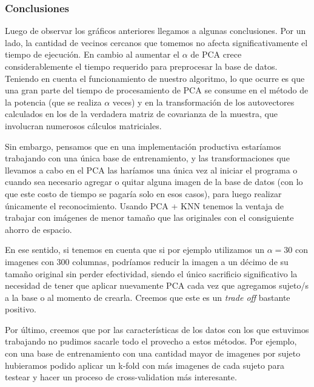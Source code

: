 \subsubsection*{Conclusiones}


Luego de observar los gráficos anteriores llegamos a algunas conclusiones.
Por un lado, la cantidad de vecinos cercanos que tomemos no afecta significativamente el tiempo de ejecución. En cambio al aumentar el $\alpha$ de PCA crece considerablemente el tiempo requerido para preprocesar la base de datos.
Teniendo en cuenta el funcionamiento de nuestro algoritmo, lo que ocurre es que una gran parte del tiempo de procesamiento de PCA se consume en el método de la potencia (que se realiza $\alpha$ veces) y en la transformación de los autovectores calculados en los de la verdadera matriz de covarianza de la muestra, que involucran numerosos cálculos matriciales.\newline

Sin embargo, pensamos que en una implementación productiva estaríamos trabajando con una única base de entrenamiento, y las transformaciones que llevamos a cabo en el PCA las haríamos una única vez al iniciar el programa o cuando sea necesario agregar o quitar alguna imagen de la base de datos (con lo que este costo de tiempo se pagaría solo en esos casos), para luego realizar únicamente el reconocimiento. Usando PCA + KNN tenemos la ventaja de trabajar con imágenes de menor tamaño que las originales con el consiguiente ahorro de espacio.

En ese sentido, si tenemos en cuenta que si por ejemplo utilizamos un $\alpha = 30$ con imagenes con 300 columnas, podríamos reducir la imagen a un décimo de su tamaño original sin perder efectividad, siendo el único sacrificio significativo la necesidad de tener que aplicar nuevamente PCA cada vez que agregamos sujeto/s a la base o al momento de crearla. Creemos que este es un \textit{trade off} bastante positivo.\newline
 
Por último, creemos que por las características de los datos con los que estuvimos trabajando no pudimos sacarle todo el provecho a estos métodos. Por ejemplo, con una base de entrenamiento con una cantidad mayor de imagenes por sujeto hubieramos podido aplicar un k-fold con más imagenes de cada sujeto para testear y hacer un proceso de cross-validation más interesante.
